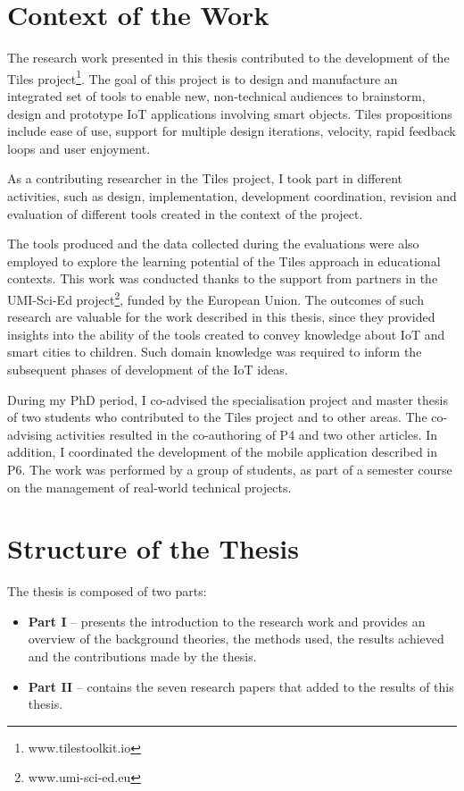 \section{Context of the Work}

The research work presented in this thesis contributed to the development of the Tiles project\footnote{www.tilestoolkit.io}. The goal of this project is to design and manufacture an integrated set of tools to enable new, non-technical audiences to brainstorm, design and prototype IoT applications involving smart objects. Tiles propositions include ease of use, support for multiple design iterations, velocity, rapid feedback loops and user enjoyment.

As a contributing researcher in the Tiles project, I took part in different activities, such as design, implementation, development coordination, revision and evaluation of different tools created in the context of the project.

The tools produced and the data collected during the evaluations were also employed to explore the learning potential of the Tiles approach in educational contexts. This work was conducted thanks to the support from partners in the UMI-Sci-Ed project\footnote{www.umi-sci-ed.eu}, funded by the European Union. The outcomes of such research are valuable for the work described in this thesis, since they provided insights into the ability of the tools created to convey knowledge about IoT and smart cities to children. Such domain knowledge was required to inform the subsequent phases of development of the IoT ideas.

During my PhD period, I co-advised the specialisation project and master thesis of two students who contributed to the Tiles project and to other areas. The co-advising activities resulted in the co-authoring of P4 and two other articles. In addition, I coordinated the development of the mobile application described in P6. The work was performed by a group of students, as part of a semester course on the management of real-world technical projects.


\section{Structure of the Thesis}

The thesis is composed of two parts:

\begin{itemize}
	\item \textbf{Part I} -- presents the introduction to the research work and provides an overview of the background theories, the methods used, the results achieved and the contributions made by the thesis.
	\item \textbf{Part II} -- contains the seven research papers that added to the results of this thesis.
\end{itemize}

